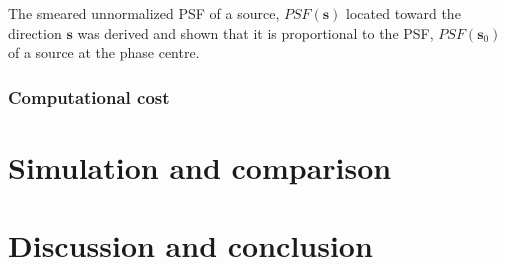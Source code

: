 The smeared unnormalized PSF of a source, $PSF(\mathbf{s})$ located toward the
direction $\mathbf{s}$ was derived and shown that it is proportional
to the PSF, $PSF(\mathbf{s}_0)$ of a source at the phase centre.

 \subsubsection{Computational cost} 
 \section{Simulation and comparison}
 \section{Discussion and conclusion}

